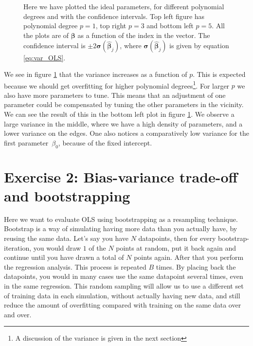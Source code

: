 \documentclass[reprint,english,notitlepage,aps,nobalancelastpage,nofootinbib]{revtex4-1}  %
\begin{document}
\begin{figure}[h]
	\endminipage\hfill
	\caption{Here we have plotted the ideal parameters, for different polynomial degrees and with the confidence intervals. Top left figure has polynomial degree $p = 1$, top right $p = 3$ and bottom left $p = 5$. All the plots are of $\boldsymbol{\beta}$ as a function of the index in the vector. The confidence interval is $\pm 2\boldsymbol{\sigma}(\boldsymbol{\hat{\beta}}_{j})$, where $\boldsymbol{\sigma}(\boldsymbol{\hat{\beta}}_{j})$ is given by equation \eqref{eq:var_OLS}.} \label{fig:var_beta}
	\endminipage
\end{figure}
We see in figure \ref{fig:var_beta} that the variance increases as a function of $p$. This is expected because we should get overfitting for higher polynomial degrees\footnote{A discussion of the variance is given in the next section}. For larger $p$ we also have more parameters to tune. This means that an adjustment of one parameter could be compensated by tuning the other parameters in the vicinity. We can see the result of this in the bottom left plot in figure \ref{fig:var_beta}. We observe a large variance in the middle, where we have a high density of parameters, and a lower variance on the edges. One also notices a comparatively low variance for the first parameter $\beta_0$, because of the fixed intercept.


\section*{Exercise 2: Bias-variance trade-off and bootstrapping}

Here we want to evaluate OLS using bootstrapping as a resampling technique. Bootstrap is a way of simulating having more data than you actually have, by reusing the same data. Let's say you have $N$ datapoints, then for every bootstrap-iteration, you would draw $1$ of the $N$ points at random, put it back again and continue until you have drawn a total of $N$ points again. After that you perform the regression analysis. This process is repeated $B$ times. By placing back the datapoints, you would in many cases use the same datapoint several times, even in the same regression. This random sampling will allow us to use a different set of training data in each simulation, without actually having new data, and still reduce the amount of overfitting compared with training on the same data over and over.
\end{document}
